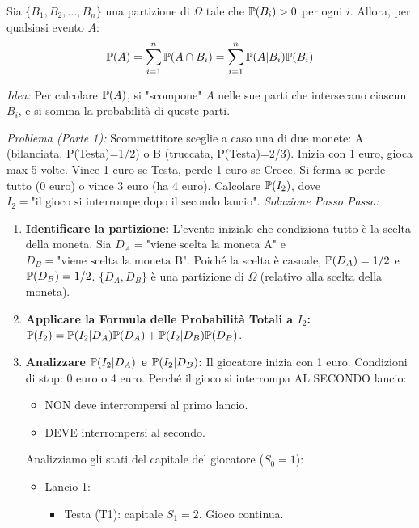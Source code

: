 \documentclass[12pt,a4paper]{article}
\begin{document}
\begin{theorem}
Sia $\{B_1, B_2, \dots, B_n\}$ una partizione di $\Omega$ tale che $\mathbb{P}(B_i) > 0$ per ogni $i$. Allora, per qualsiasi evento $A$:
\[ \mathbb{P}(A) = \sum_{i=1}^n \mathbb{P}(A \cap B_i) = \sum_{i=1}^n \mathbb{P}(A|B_i) \mathbb{P}(B_i) \]
\end{theorem}
\textit{Idea:} Per calcolare $\mathbb{P}(A)$, si "scompone" $A$ nelle sue parti che intersecano ciascun $B_i$, e si somma la probabilità di queste parti.

\begin{example}
\textit{Problema (Parte 1):} Scommettitore sceglie a caso una di due monete: A (bilanciata, P(Testa)=1/2) o B (truccata, P(Testa)=2/3). Inizia con 1 euro, gioca max 5 volte. Vince 1 euro se Testa, perde 1 euro se Croce. Si ferma se perde tutto (0 euro) o vince 3 euro (ha 4 euro).
Calcolare $\mathbb{P}(I_2)$, dove $I_2 = \text{"il gioco si interrompe dopo il secondo lancio"}$.
\textit{Soluzione Passo Passo:}
\begin{enumerate}
    \item \textbf{Identificare la partizione:} L'evento iniziale che condiziona tutto è la scelta della moneta.
    Sia $D_A = \text{"viene scelta la moneta A"}$ e $D_B = \text{"viene scelta la moneta B"}$.
    Poiché la scelta è casuale, $\mathbb{P}(D_A) = 1/2$ e $\mathbb{P}(D_B) = 1/2$.
    $\{D_A, D_B\}$ è una partizione di $\Omega$ (relativo alla scelta della moneta).
    \item \textbf{Applicare la Formula delle Probabilità Totali a $I_2$:}
    $\mathbb{P}(I_2) = \mathbb{P}(I_2|D_A)\mathbb{P}(D_A) + \mathbb{P}(I_2|D_B)\mathbb{P}(D_B)$.
    \item \textbf{Analizzare $\mathbb{P}(I_2|D_A)$ e $\mathbb{P}(I_2|D_B)$:}
    Il giocatore inizia con 1 euro.
    Condizioni di stop: 0 euro o 4 euro.
    Perché il gioco si interrompa AL SECONDO lancio:
    \begin{itemize}
        \item NON deve interrompersi al primo lancio.
        \item DEVE interrompersi al secondo.
    \end{itemize}
    Analizziamo gli stati del capitale del giocatore ($S_0=1$):
    \begin{itemize}
        \item Lancio 1:
            \begin{itemize}
                \item Testa (T1): capitale $S_1=2$. Gioco continua.

\end{itemize}
\end{itemize}
\end{enumerate}
\end{example}
\end{document}
